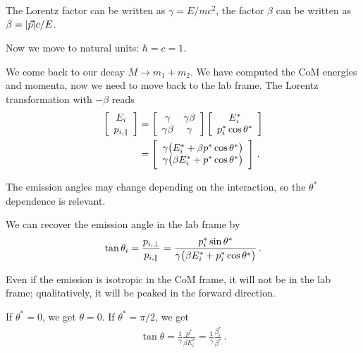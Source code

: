 \documentclass[main.tex]{subfiles}
\begin{document}

The Lorentz factor can be written as \(\gamma = E / mc^2\), the  
factor \(\beta \) can be written as \(\beta = \abs{\vec{p}} c / E\). 

Now we move to natural units: \(\hbar = c = 1\). 

We come back to our decay \(M \to m_1 + m_2 \). 
We have computed the CoM energies and momenta, now we need
to move back to the lab frame. 
The Lorentz transformation with \(- \beta \) reads 
%
\begin{align}
\left[\begin{array}{c}
E_i \\ 
p_{i, \parallel}
\end{array}\right]
&= \left[\begin{array}{cc}
\gamma  & \gamma \beta  \\ 
\gamma \beta  &  \gamma 
\end{array}\right] 
\left[\begin{array}{c}
E_{i}^{*} \\ 
p_{i}^{*} \cos \theta^{*}
\end{array}\right]  \\
&= 
\left[\begin{array}{c}
\gamma \qty(E_i^{*} + \beta p^{*} \cos \theta^{*}) \\ 
\gamma \qty(\beta E_i^{*} + p^{*} \cos \theta^{*})
\end{array}\right]
\,.
\end{align}

The emission angles may change depending on the interaction, so the \(\theta^{*}\) dependence is relevant. 

We can recover the emission angle in the lab frame by 
%
\begin{align}
\tan \theta_i = \frac{p_{i, \perp}}{p_{i, \parallel}}
= \frac{p_i^{*} \sin \theta^{*}}{\gamma \qty(\beta E_i^{*} + p_i^{*} \cos \theta^{*})}
\,.
\end{align}

Even if the emission is isotropic in the CoM frame, it will not be in the lab frame; qualitatively, it will be peaked in the forward direction. 

If \(\theta^{*} = 0\), we get \(\theta = 0\).
If \(\theta^{*}= \pi /2\), we get 
%
\begin{align}
\tan \theta = \frac{1}{\gamma } \frac{p^{*}}{\beta E_i^{*}}
= \frac{1}{\gamma } \frac{\beta^{*}_i}{\beta^{*}}
\,.
\end{align}
\end{document}

